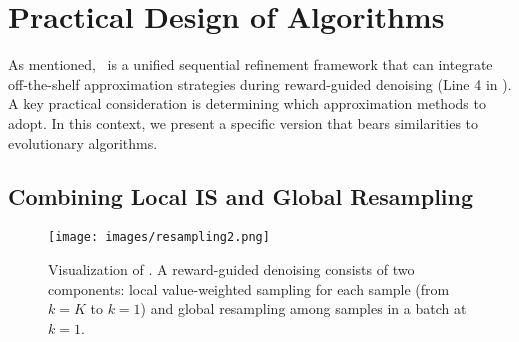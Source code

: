 \vspace{-2mm}
\section{Practical Design of Algorithms}\label{sec:practical}
\vspace{-2mm}

As mentioned, \alg\ is a unified sequential refinement framework that can integrate off-the-shelf approximation strategies during reward-guided denoising (Line 4 in ). A key practical consideration is determining which approximation methods to adopt. In this context, we present a specific version that bears similarities to evolutionary algorithms.

\vspace{-2mm}
\subsection{Combining Local IS and Global Resampling} 

\begin{figure}[!th]
    \centering
    \texttt{[image: images/resampling2.png]}
    \caption{Visualization of . A reward-guided denoising consists of two components: local value-weighted sampling for each sample (from 
$k=K$ to $k=1$) and global resampling among samples in a batch at $k=1$.}
    \label{fig:instance}
\end{figure}


